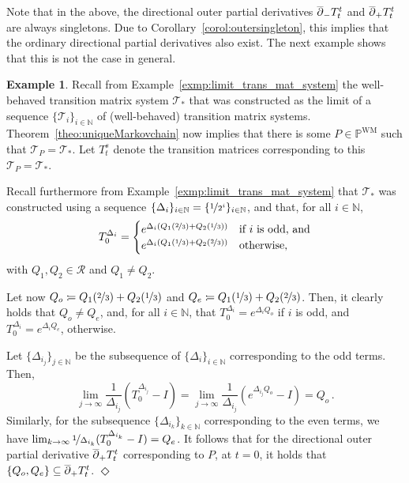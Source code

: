 \documentclass[10pt,a4paper]{paper}
\theoremstyle{definition}
\newtheorem{exmp}{Example}%
\newcommand{\nats}{\mathbb{N}}
\newcommand{\processes}{\mathbb{P}}
\newcommand{\wmprocesses}{\processes^{\mathrm{WM}}}
\newcommand{\coloneqq}{:\!=}
\newcommand{\exampleend}{\hfill$\Diamond$}
\begin{document}
Note that in the above, the directional outer partial derivatives $\smash{\overline{\partial}}_-T_t^t$ and $\smash{\overline{\partial}}_+T_t^t$ are always singletons. Due to Corollary~\ref{corol:outersingleton}, this implies that the ordinary directional partial derivatives also exist. The next example shows that this is not the case in general.

\begin{exmp}\label{exmp:markov_with_no_deriv}
Recall from Example~\ref{exmp:limit_trans_mat_system} the well-behaved transition matrix system $\mathcal{T}_*$ that was constructed as the limit of a sequence $\{\mathcal{T}_i\}_{i\in\nats}$ of (well-behaved) transition matrix systems. Theorem~\ref{theo:uniqueMarkovchain} now implies that there is some $P\in\wmprocesses$ such that $\mathcal{T}_P = \mathcal{T}_*$. Let $T_t^s$ denote the transition matrices corresponding to this $\mathcal{T}_P = \mathcal{T}_*$.

Recall furthermore from Example~\ref{exmp:limit_trans_mat_system} that $\mathcal{T}_*$ was constructed using a sequence $\{\Delta_i\}_{i\in\nats}=\{\nicefrac{1}{2^i}\}_{i\in\nats}$, and that, for all $i\in\nats$,
\begin{equation*}
T_0^{\Delta_i} = \begin{cases}
e^{\Delta_i(Q_1(\nicefrac{2}{3}) + Q_2(\nicefrac{1}{3}))} & \text{if $i$ is odd, and} \\
e^{\Delta_i(Q_1(\nicefrac{1}{3}) + Q_2(\nicefrac{2}{3}))} & \text{otherwise,}
\end{cases}
\end{equation*}
with $Q_1,Q_2\in\mathcal{R}$ and $Q_1\neq Q_2$. 

Let now $Q_o\coloneqq Q_1(\nicefrac{2}{3}) + Q_2(\nicefrac{1}{3})$ and $Q_e\coloneqq Q_1(\nicefrac{1}{3}) + Q_2(\nicefrac{2}{3})$. Then, it clearly holds that $Q_o\neq Q_e$, and, for all $i\in\nats$, that $T_0^{\Delta_i}=e^{\Delta_i Q_o}$ if $i$ is odd, and $T_0^{\Delta_i}=e^{\Delta_iQ_e}$, otherwise.

Let $\{\Delta_{i_j}\}_{j\in\nats}$ be the subsequence of $\{\Delta_i\}_{i\in\nats}$ corresponding to the odd terms. Then,
\begin{equation*}
\lim_{j\to\infty}\frac{1}{\Delta_{i_j}}\left(T_0^{\Delta_{i_j}}-I\right) = \lim_{j\to\infty}\frac{1}{\Delta_{i_j}}\left(e^{\Delta_{i_j}Q_o}-I\right) = Q_o\,.
\end{equation*}
Similarly, for the subsequence $\{\Delta_{i_k}\}_{k\in\nats}$ corresponding to the even terms, we have $\lim_{k\to\infty}\nicefrac{1}{\Delta_{i_k}}(T_0^{\Delta_{i_k}}-I)=Q_e$. It follows that for the directional outer partial derivative $\smash{\overline{\partial}}_+T_t^t$ corresponding to $P$, at $t=0$, it holds that $\{Q_o,Q_e\}\subseteq \smash{\overline{\partial}}_+T_t^t$.
\exampleend
\end{exmp}
\end{document}
